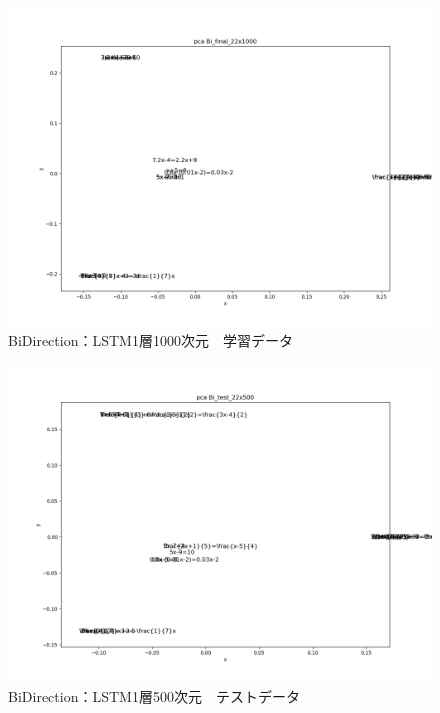 \documentclass[a4j,11pt,report]{jsbook}
\begin{document}
\begin{center}
  \begin{figure}[tb]
    \centering
    \includegraphics[width=0.7\linewidth]{result/pca_formula_Bi_final_22x1000_1_Wed_Feb_06_06:54:20.png}
    \caption{BiDirection：LSTM1層1000次元　学習データ}
    \label{fig:Bi500layer2}
  \end{figure}
\end{center}

\begin{center}
  \begin{figure}[tb]
    \centering
    \includegraphics[width=0.7\linewidth]{result/pca_formula_Bi_test_22x500_1_Wed_Feb_06_06:26:57.png}
    \caption{BiDirection：LSTM1層500次元　テストデータ}
    \label{fig:Bi500layer3}
  \end{figure}
\end{center}
\end{document}
